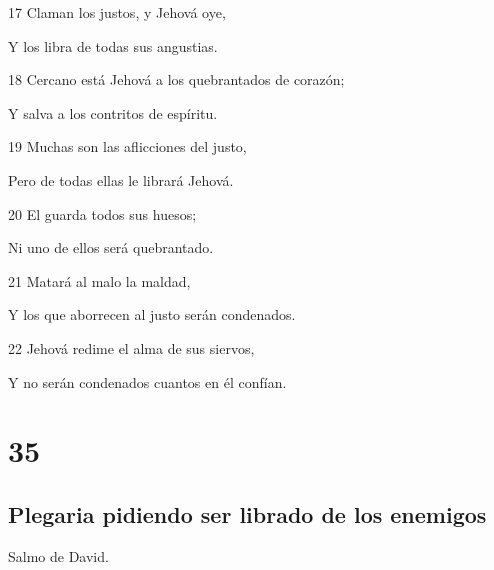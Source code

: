 \par 17 Claman los justos, y Jehová oye,
\par Y los libra de todas sus angustias.
\par 18 Cercano está Jehová a los quebrantados de corazón;
\par Y salva a los contritos de espíritu.
\par 19 Muchas son las aflicciones del justo,
\par Pero de todas ellas le librará Jehová.
\par 20 El guarda todos sus huesos;
\par Ni uno de ellos será quebrantado.
\par 21 Matará al malo la maldad,
\par Y los que aborrecen al justo serán condenados.
\par 22 Jehová redime el alma de sus siervos,
\par Y no serán condenados cuantos en él confían.

\chapter{35}

\section*{Plegaria pidiendo ser librado de los enemigos}

\par Salmo de David.

